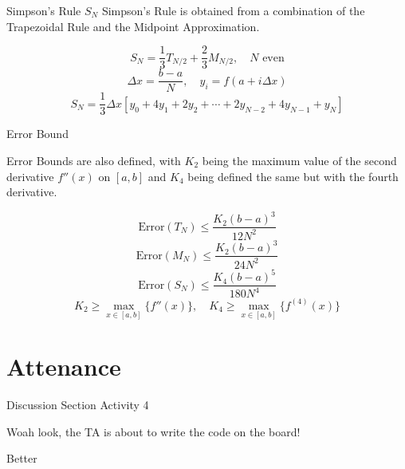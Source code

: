 \documentclass{beamer}
\begin{document}
\begin{frame}{Simpson's Rule $S_N$}
    Simpson's Rule is obtained from a combination of the Trapezoidal Rule and the Midpoint Approximation. 

    \[
        S_N = \frac{1}{3}T_{N/2} + \frac{2}{3}M_{N/2}, \quad N \text{ even}
    \]
    \[
        \Delta x = \frac{b-a}{N}, \quad  y_i = f(a + i\Delta x)
    \]
    \[
        S_N = \frac{1}{3}\Delta x [y_0 + 4y_1 + 2y_2  + \cdots + 2y_{N-2} + 4y_{N-1} + y_N]
    \]
    
\end{frame}

\begin{frame}{Error Bound}

    Error Bounds are also defined, with $K_2$ being the maximum value of the second derivative $f''(x)$ on $[a, b]$ and $K_4$ being defined the same but with the fourth derivative. 

    \[
        \text{Error}(T_N) \le \frac{K_2(b-a)^3}{12N^2}
    \]
    \[
        \text{Error}(M_N) \le \frac{K_2(b-a)^3}{24N^2}
    \]
    \[
        \text{Error}(S_N) \le \frac{K_4(b-a)^5}{180N^4}
    \]
    \[
        K_2 \ge \max_{x \in [a, b]}\{f''(x)\}, \quad K_4 \ge \max_{x \in [a, b]}\{f^{(4)}(x)\}
    \]


\end{frame}


\section{Attenance}
\begin{frame}{Discussion Section Activity 4}
    \raggedright
    Woah look, the TA is about to write the code on the board!
\end{frame}

\begin{frame}

Better

\end{frame}
\end{document}
